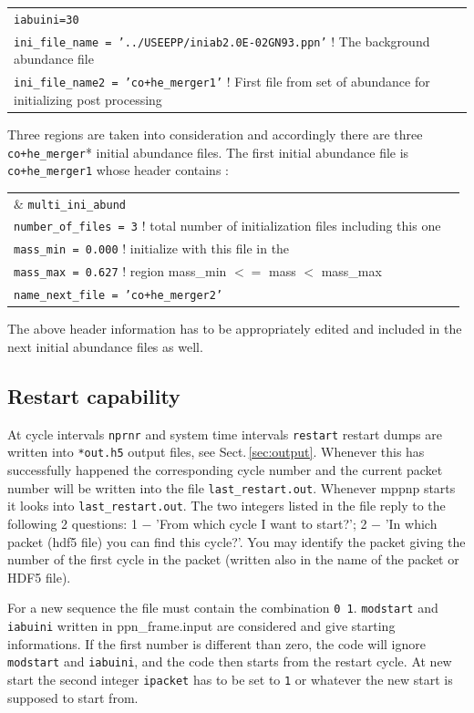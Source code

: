 \begin{tabularx}{0.9\textwidth}{lX}
\texttt{iabuini=30} \\
\texttt{ini\_file\_name = '../USEEPP/iniab2.0E-02GN93.ppn'} ! The background abundance file \\
\texttt{ini\_file\_name2 = 'co+he\_merger1'}		 ! First file from set of abundance for initializing post processing \\
\end{tabularx}

Three regions are taken into consideration and accordingly there are three \texttt{co+he\_merger}* initial abundance files. The first initial abundance file is \texttt{co+he\_merger1} whose header contains :

\begin{tabularx}{0.9\textwidth}{lX}
$\&$ \texttt{multi\_ini\_abund} \\
\texttt{number\_of\_files = 3}    ! total number of initialization files including this one\\
\texttt{mass\_min = 0.000}       ! initialize with this file in the \\
\texttt{mass\_max = 0.627}       ! region mass\_min $<=$ mass $<$ mass\_max \\
\texttt{name\_next\_file = 'co+he\_merger2'}\\
\end{tabularx}

The above header information has to be appropriately edited and included in the next initial abundance files as well. 

\subsection{Restart capability}
 At cycle intervals \texttt{nprnr} and system time
intervals \texttt{restart} restart dumps are written into
\texttt{*out.h5} output files, see Sect.\,\ref{sec:output}. Whenever
this has successfully happened the corresponding cycle number and the
current packet number will be written into the file
\texttt{last\_restart.out}. Whenever mppnp starts it looks into
\texttt{last\_restart.out}.  The two integers listed in the file reply
to the following 2 questions: 1 $-$ 'From which cycle I want to
start?'; 2 $-$ 'In which packet (hdf5 file) you can find this
cycle?'. You may identify the packet giving the number of the first
cycle in the packet (written also in the name of the packet or HDF5
file).

For a new sequence the file must contain the combination \texttt{0 1}.
\texttt{modstart} and \texttt{iabuini} written in ppn\_frame.input are
considered and give starting informations.  If the first number is
different than zero, the code will ignore \texttt{modstart} and
\texttt{iabuini}, and the code then starts from the restart cycle. At
new start the second integer \texttt{ipacket} has to be set to
\texttt{1} or whatever the new start is supposed to start from.


